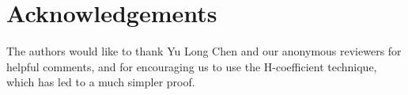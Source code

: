 \documentclass[eprint.tex]{subfiles}
\begin{document}
\section{Acknowledgements}
The authors would like to thank Yu Long Chen and our anonymous reviewers for helpful comments,
and for encouraging us to use the H-coefficient technique,
which has led to a much simpler proof.
\subbib
\end{document}
